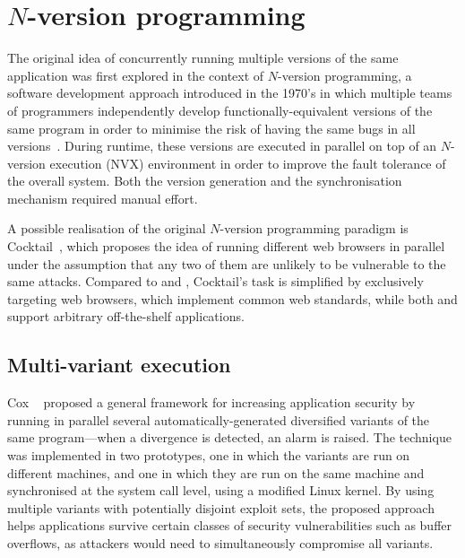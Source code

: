 \section{$N$-version programming}
\label{related:nvp}

The original idea of concurrently running multiple versions of the same
application was first explored in the context of $N$-version programming, a
software development approach introduced in the 1970's in which multiple teams
of programmers independently develop functionally-equivalent versions of the
same program in order to minimise the risk of having the same bugs in all
versions~\cite{chen1995}. During runtime, these versions are executed in
parallel on top of an $N$-version execution (NVX) environment in order to
improve the fault tolerance of the overall system. Both the version generation
and the synchronisation mechanism required manual effort.

A possible realisation of the original $N$-version programming paradigm is
Cocktail~\cite{cocktail}, which proposes the idea of running different web
browsers in parallel under the assumption that any two of them are unlikely to
be vulnerable to the same attacks. Compared to \mx and \varan, Cocktail's task
is simplified by exclusively targeting web browsers, which implement common web
standards, while both \mx and \varan support arbitrary off-the-shelf
applications.



\subsection{Multi-variant execution}

Cox \etal~\cite{cox2006} proposed a general framework for increasing
application security by running in parallel several automatically-generated
diversified variants of the same program---when a divergence is detected, an
alarm is raised. The technique was implemented in two prototypes, one in which
the variants are run on different machines, and one in which they are run on
the same machine and synchronised at the system call level, using a modified
Linux kernel. By using multiple variants with potentially disjoint exploit
sets, the proposed approach helps applications survive certain classes of
security vulnerabilities such as buffer overflows, as attackers would need to
simultaneously compromise all variants.

